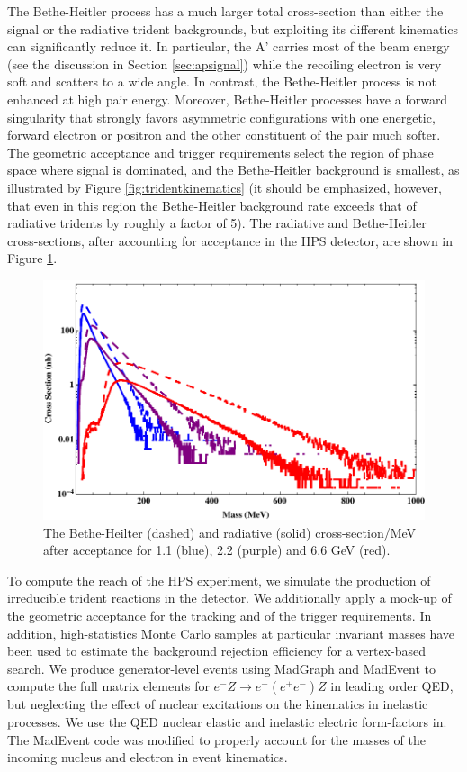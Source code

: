 The Bethe-Heitler process has a much larger total cross-section than either the signal 
or the radiative trident backgrounds, but exploiting its different kinematics can 
significantly reduce it. In particular, the A' carries most of the beam energy 
(see the discussion in Section \ref{sec:apsignal}) while the recoiling electron is very soft and 
scatters to a wide angle. In contrast, the Bethe-Heitler process is not enhanced at 
high pair energy. Moreover, Bethe-Heitler processes have a forward singularity that 
strongly favors asymmetric configurations with one energetic, forward electron or 
positron and the other constituent of the pair much softer.   The geometric acceptance and trigger 
requirements select the region of phase space where signal is dominated, and the 
Bethe-Heitler background is smallest, as illustrated by Figure \ref{fig:tridentkinematics} (it should be 
emphasized, however, that even in this region the Bethe-Heitler background rate exceeds 
that of radiative tridents by roughly a factor of 5).  The radiative and Bethe-Heitler  cross-sections, after accounting for acceptance
in the HPS detector, are shown in Figure \ref{fig:bkgXS}.

\begin{figure}
\includegraphics[scale=1]{reach/HPS-CrossSections.pdf}
\caption{The Bethe-Heilter (dashed) and radiative (solid) cross-section/MeV after acceptance for 1.1 (blue), 2.2 (purple) and 6.6 GeV (red).}
\label{fig:bkgXS}
\end{figure} 

To compute the reach of the HPS experiment, we simulate the production of irreducible 
trident reactions in the detector. We additionally apply a mock-up of the geometric 
acceptance for the tracking and of the trigger requirements.  In addition, high-statistics 
Monte Carlo samples at particular invariant masses have been used to estimate 
the background rejection efficiency for a vertex-based search.  
We produce generator-level events using MadGraph and MadEvent \cite{Alwall:2007st}  to compute the full 
matrix elements for $e^-Z \rightarrow e^- (e^+ e^-)Z$ in leading order QED, but 
neglecting the effect of nuclear excitations on the kinematics in inelastic processes. 
We use the QED nuclear elastic and inelastic electric form-factors in\cite{Kim:1973he}. The MadEvent 
code was modified to properly account for the masses of the incoming nucleus and electron 
in event kinematics.

